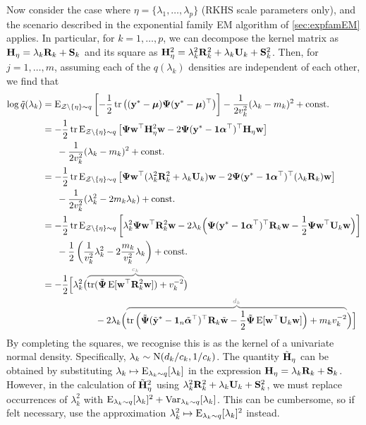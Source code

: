Now consider the case where $\eta = \{\lambda_1,\dots,\lambda_p \}$ (RKHS scale parameters only), and the scenario described in the exponential family EM algorithm of \cref{sec:expfamEM} applies.
In particular, for $k=1,\dots,p$, we can decompose the kernel matrix as ${\mathbf H}_\eta = \lambda_k {\mathbf R}_k + {\mathbf S}_k$ and its square as ${\mathbf H}_\eta^2 = \lambda_k^2 {\mathbf R}_k^2 + \lambda_k {\mathbf U}_k + {\mathbf S}_k^2$.
Then, for $j = 1,\dots,m$, assuming each of the $q(\lambda_k)$ densities are independent of each other, we find that
\begin{align*}
  \log \tilde q(\lambda_k) 
  &= \E_{\cZ\backslash\{\eta\}\sim q} \left[ 
  - \half\tr \big((\by^* - \bmu) \bPsi (\by^* - \bmu)^\top  \big)
  \right] 
  - \frac{1}{2v_k^2} (\lambda_k - m_k)^2 + \const \\
  &= - \half\tr \E_{\cZ\backslash\{\eta\}\sim q} \left[ \bPsi\bw^\top \bH_\eta^2 \bw - 2\bPsi(\by^* - \bone\balpha^\top)^\top\bH_\eta \bw \right] \\
  &\phantom{==} - \frac{1}{2v_k^2} (\lambda_k - m_k)^2 + \const \\
  &= - \half\tr \E_{\cZ\backslash\{\eta\}\sim q} \left[ \bPsi\bw^\top (\lambda_k^2\bR_k^2 + \lambda_k\bU_k) \bw - 2\bPsi(\by^* - \bone\balpha^\top)^\top(\lambda_k\bR_k) \bw \right] \\
  &\phantom{==} - \frac{1}{2v_k^2} (\lambda_k^2 - 2m_k\lambda_k) + \const \\
  &= - \half\tr \E_{\cZ\backslash\{\eta\}\sim q} \left[ 
  \lambda_k^2\bPsi\bw^\top \bR_k^2 \bw 
  -2 \lambda_k \Big(
  \bPsi(\by^* - \bone\balpha^\top)^\top\bR_k \bw 
  -\half\bPsi\bw^\top \bU_k \bw
  \Big) \right] \\
  &\phantom{==} - \half\left(\frac{1}{v_k^2}\lambda_k^2  - 2 \frac{m_k}{v_k^2} \lambda_k \right) + \const \\
  &= -\half \Big[ 
 \lambda_k^2 \big( 
 \greyoverbrace{\tr(\tilde\bPsi\E[\bw^\top\bR_k^2\bw]) + v_k^{-2}}{c_k}
 \big) \\ 
  &\hspace{2cm} - 2\lambda_k \Big( 
  \greyoverbrace{
  \tr\Big( \tilde\bPsi(\tilde\by^* - \bone_n\tilde\balpha^\top)^\top\bR_k \tilde\bw 
  - \half\tilde\bPsi\E[\bw^\top \bU_k \bw] \Big) 
  + m_k v_k^{-2}}{d_k}
  \Big) \Big]
\end{align*}
By completing the squares, we recognise this is as the kernel of a univariate normal density. 
Specifically, $\lambda_k \sim \operatorname{N}(d_k/c_k,1/c_k)$.
The quantity $\tilde{{\mathbf H}}_\eta$ can be obtained by substituting $\lambda_k \mapsto \operatorname{E}_{\lambda_k\sim q}[\lambda_k]$ in the expression ${\mathbf H}_\eta = \lambda_k {\mathbf R}_k + {\mathbf S}_k$.
However, in the calculation of $\tilde{{\mathbf H}}_\eta^2$ using $\lambda_k^2 {\mathbf R}_k^2 + \lambda_k {\mathbf U}_k + {\mathbf S}_k^2$, we must replace occurrences of  $\lambda_k^2$ with $\operatorname{E}_{\lambda_k\sim q}[\lambda_k]^2 +  \operatorname{Var}_{\lambda_k\sim q}[\lambda_k]$.
This can be cumbersome, so if felt necessary, use the approximation $\lambda_k^2 \mapsto \operatorname{E}_{\lambda_k\sim q}[\lambda_k]^2$ instead.


